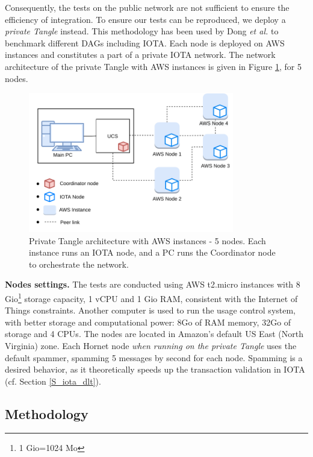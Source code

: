 Consequently, the tests on the public network are not sufficient to ensure the efficiency of integration.
To ensure our tests can be reproduced, we deploy a \emph{private Tangle} instead. This methodology has been used by Dong \emph{et al.} \cite{Dong2019} to benchmark different DAGs including IOTA. Each node is deployed on AWS instances and constitutes a part of a private IOTA network. The network architecture of the private Tangle with AWS instances is given in Figure \ref{F_network_architecture}, for 5 nodes.

\begin{figure}[t]
\centering
\includegraphics[width=0.8\textwidth]{Images/AWSarchitecture.pdf}
\caption{Private Tangle architecture with AWS instances - 5 nodes. Each instance runs an IOTA node, and a PC runs the Coordinator node to orchestrate the network.}
\label{F_network_architecture}
\end{figure}

\textbf{Nodes settings.} The tests are conducted using AWS t2.micro instances with 8 Gio\footnote{1 Gio=1024 Mo} storage capacity, 1 vCPU and 1 Gio RAM, consistent with the Internet of Things constraints. Another computer is used to run the usage control system, with better storage and computational power: 8Go of RAM memory, 32Go of storage and 4 CPUs. The nodes are located in Amazon's default US East (North Virginia) zone. Each Hornet node \emph{when running on the private Tangle} uses the default spammer, spamming 5 messages by second for each node. Spamming is a desired behavior, as it theoretically speeds up the transaction validation in IOTA (cf. Section \ref{S_iota_dlt}).

\subsection{Methodology}
\label{ss_methodology}

